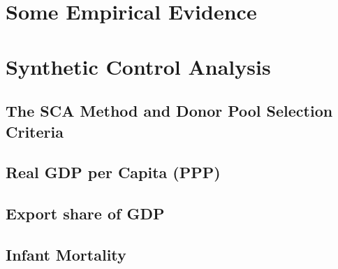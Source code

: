 \documentclass[11pt]{article}
\begin{document}
\section{Some Empirical Evidence}

\section{Synthetic Control Analysis}

\subsection{The SCA Method and Donor Pool Selection Criteria}

\subsection{Real GDP per Capita (PPP)}

\subsection{Export share of GDP}

\subsection{Infant Mortality}







\end{document}
